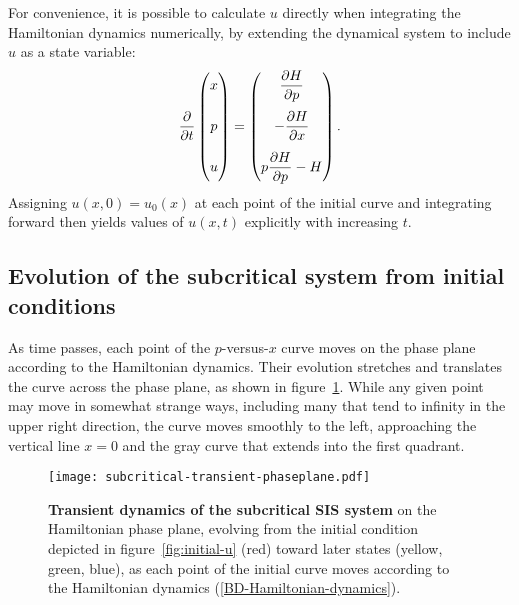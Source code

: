 \documentclass[review]{elsarticle}
\begin{document}
For convenience, it is possible to calculate $u$ directly when integrating
the Hamiltonian dynamics numerically,
by extending the dynamical system to include
$u$ as a state variable:
\newcommand*{\dhdpstrut}{\vphantom{\displaystyle\frac{\partial H}{\partial p}}}
\begin{dmath*}
 \frac{\partial}{\partial t} \begin{pmatrix}
	x \dhdpstrut\\[12pt]
	p \dhdpstrut\\[12pt]
	u \dhdpstrut \end{pmatrix}
   = \begin{pmatrix}
	\displaystyle \frac{\partial H}{\partial p} \\[12pt]
        \displaystyle -\frac{\partial H}{\partial x} \\[12pt]
        \displaystyle p\frac{\partial H}{\partial p} - H
     \end{pmatrix}.
\end{dmath*}
Assigning $u(x,0)=u_0(x)$ at each point of the initial curve and integrating
forward then yields values of $u(x,t)$ explicitly with increasing $t$.

\subsection{Evolution of the subcritical system from initial conditions}

As time passes, each point of the $p$-versus-$x$ curve moves on the
phase plane according to the Hamiltonian dynamics.  Their evolution stretches
and translates the curve across the phase plane, as shown in
figure~\ref{fig:s-evolution}.  While any given point may move in somewhat
strange ways, including many that tend to infinity in the upper right
direction, the curve moves smoothly to the left,
approaching the vertical line $x=0$ and the gray curve that
extends into the first quadrant.

\begin{figure}
\centering
\texttt{[image: subcritical-transient-phaseplane.pdf]}
\caption{ \label{fig:s-evolution}
{\bf Transient dynamics of the subcritical SIS system}
on the Hamiltonian phase plane,
evolving from the initial condition depicted in figure~\ref{fig:initial-u}
(red) toward later states (yellow, green, blue),
as each point of the initial curve moves according to the
Hamiltonian dynamics (\ref{BD-Hamiltonian-dynamics}).
}
\end{figure}
\end{document}
